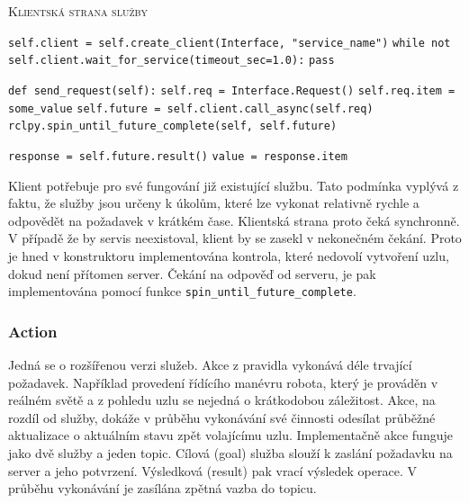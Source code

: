 \begin{algorithm}[h!]
	\label{}
	\caption{\textsc{Klientská strana služby}}
	
	\DontPrintSemicolon
	\SetAlgoNoLine
	\SetNlSty{}{}{:}
	\SetNlSkip{-1.1em}
	
	\BlankLine \Indp\Indpp
	
	\texttt{self.client = self.create\_client(Interface, "service\_name")}\;
	\texttt{while not self.client.wait\_for\_service(timeout\_sec=1.0):}\;
	\Indp\Indp
	\texttt{pass}\;
	\Indm\Indm

	\BlankLine
	\texttt{def send\_request(self):}\;
	\Indp\Indp
	\texttt{self.req = Interface.Request()}\;
	\texttt{self.req.item = some\_value}\;
	\texttt{self.future = self.client.call\_async(self.req)}\;
	\texttt{rclpy.spin\_until\_future\_complete(self, self.future)}\;
	
	\BlankLine
	\texttt{response = self.future.result()}\;
	\texttt{value = response.item}\;
\end{algorithm}
\newpage
Klient potřebuje pro své fungování již existující službu. Tato podmínka vyplývá z faktu, že služby jsou určeny k úkolům, které lze vykonat relativně rychle a odpovědět na požadavek v krátkém čase. Klientská strana proto čeká synchronně. V případě že by servis neexistoval, klient by se zasekl v nekonečném čekání. Proto je hned v konstruktoru implementována kontrola, které nedovolí vytvoření uzlu, dokud není přítomen server. Čekání na odpověď od serveru, je pak implementována pomocí funkce \verb|spin_until_future_complete|. \cite{ros2_documentation}

\subsubsection*{Action} \label{theory:action}
Jedná se o rozšířenou verzi služeb. Akce z pravidla vykonává déle trvající požadavek. Například provedení řídícího manévru robota, který je prováděn v reálném světě a z pohledu uzlu se nejedná o krátkodobou záležitost. Akce, na rozdíl od služby, dokáže v průběhu vykonávání své činnosti odesílat průběžné aktualizace o aktuálním stavu zpět volajícímu uzlu. \cite[str:~6]{ros2_introduction} Implementačně akce funguje jako dvě služby a jeden topic. Cílová (goal) služba slouží k zaslání požadavku na server a jeho potvrzení. Výsledková (result) pak vrací výsledek operace. V průběhu vykonávání je zasílána zpětná vazba do topicu. \cite{ros2_documentation}

